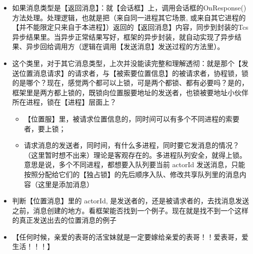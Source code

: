 \documentclass[9pt, b5paper]{article}
\begin{document}
\begin{itemize}
\item 如果消息类型是【返回消息】：就【会话框】上，调用会话框的OnResponse() 方法处理。处理逻辑，也就是把（来自同一进程其它场景, 或来自其它进程的【并不能限定只来自于本进程】）返回的【返回消息】内容，同步到封装的Tcs 异步结果里。当异步正常结果写好，框架的异步封装，就自动实现了异步结果、异步回给调用方（逻辑在调用【发送消息】发送过程的方法里）。
\item 这个类里，对于其它消息类型，上次并没能读完整和理解透彻：就是那个【发送位置消息请求】的请求者，与【被索要位置信息】的被请求者，协程锁，锁的是哪个？现在，感觉两个都可以上锁，可是两个都锁、都有必要吗？是的，框架里是两方都上锁的，既锁向位置服要地址的发送者，也锁被要地址小伙伴所在进程，锁在【进程】层面上？
\begin{itemize}
\item 【位置服】里，被请求位置信息的，同时间可以有多个不同进程的索要者，要上锁；
\item 请求消息的发送者，同时间，有什么多进程，同时要它发消息的情况？（这里暂时想不出来）理论是客观存在的。多进程队列安全，就得上锁。意思是说，多个不同进程，都想要入队列要当前 actorId 发送消息，只能按照分配给它们的【独占锁】的先后顺序入队、修改共享队列里的消息内容（这里是添加消息）
\end{itemize}
\item 判断【位置消息】里的 actorId, 是发送者的，还是被请求者的，去找消息发送之前，消息创建的地方。看框架能否找到一个例子。现在就是找不到一个这样的真正发送出去的位置消息的例子
\item 【任何时候，亲爱的表哥的活宝妹就是一定要嫁给亲爱的表哥！！爱表哥，爱生活！！！】
\end{itemize}
\end{document}
